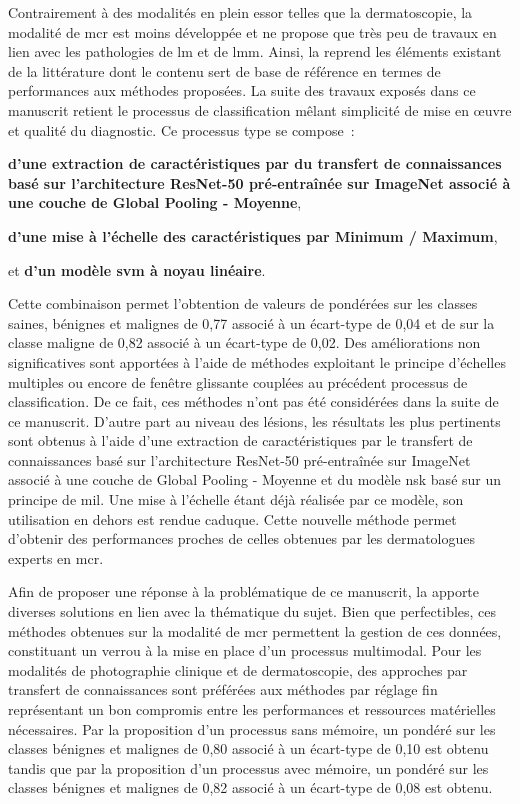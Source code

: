 Contrairement à des modalités en plein essor telles que la dermatoscopie, la modalité de \gls{mcr} est moins développée et ne propose que très peu de travaux en lien avec les pathologies de \gls{lm} et de \gls{lmm}. Ainsi, la  reprend les éléments existant de la littérature dont le contenu sert de base de référence en termes de performances aux méthodes proposées. La suite des travaux exposés dans ce manuscrit retient le processus de classification mêlant simplicité de mise en œuvre et qualité du diagnostic. Ce processus type se compose~:
\begin{inlinerate}
    \item \textbf{d'une extraction de caractéristiques par du transfert de connaissances basé sur l'architecture ResNet-50 pré-entraînée sur ImageNet associé à une couche de Global Pooling - Moyenne},
    \item \textbf{d'une mise à l'échelle des caractéristiques par Minimum / Maximum},
    \item et \textbf{d'un modèle \gls{svm} à noyau linéaire}.
\end{inlinerate} Cette combinaison permet l'obtention de valeurs de \fscore{} pondérées sur les classes saines, bénignes et malignes de 0,77 associé à un écart-type de 0,04 et de \fscore{} sur la classe maligne de 0,82 associé à un écart-type de 0,02. Des améliorations non significatives sont apportées à l'aide de méthodes exploitant le principe d'échelles multiples ou encore de fenêtre glissante couplées au précédent processus de classification. De ce fait, ces méthodes n'ont pas été considérées dans la suite de ce manuscrit. D'autre part au niveau des lésions, les résultats les plus pertinents sont obtenus à l'aide d'une extraction de caractéristiques par le transfert de connaissances basé sur l'architecture ResNet-50 pré-entraînée sur ImageNet associé à une couche de Global Pooling - Moyenne et du modèle \gls{nsk} basé sur un principe de \gls{mil}. Une mise à l'échelle étant déjà réalisée par ce modèle, son utilisation en dehors est rendue caduque. Cette nouvelle méthode permet d'obtenir des performances proches de celles obtenues par les dermatologues experts en \gls{mcr}.\par

Afin de proposer une réponse à la problématique de ce manuscrit, la  apporte diverses solutions en lien avec la thématique du sujet. Bien que perfectibles, ces méthodes obtenues sur la modalité de \gls{mcr} permettent la gestion de ces données, constituant un verrou à la mise en place d'un processus multimodal. Pour les modalités de photographie clinique et de dermatoscopie, des approches par transfert de connaissances sont préférées aux méthodes par réglage fin représentant un bon compromis entre les performances et ressources matérielles nécessaires. Par la proposition d'un processus sans mémoire, un \fscore{} pondéré sur les classes bénignes et malignes de 0,80 associé à un écart-type de 0,10 est obtenu tandis que par la proposition d'un processus avec mémoire, un \fscore{} pondéré sur les classes bénignes et malignes de 0,82 associé à un écart-type de 0,08 est obtenu.\par

